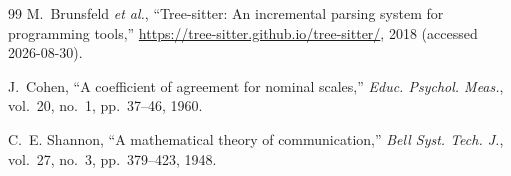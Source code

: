 \documentclass[conference]{IEEEtran}
\begin{document}
\begin{thebibliography}{99}
M.~Brunsfeld \emph{et al.}, ``Tree-sitter: An incremental parsing system
for programming tools,'' \url{https://tree-sitter.github.io/tree-sitter/},
2018 (accessed 2026-08-30).

J.~Cohen, ``A coefficient of agreement for nominal scales,'' \emph{Educ.
Psychol. Meas.}, vol.~20, no.~1, pp.~37--46, 1960.

C.~E. Shannon, ``A mathematical theory of communication,'' \emph{Bell Syst.
Tech. J.}, vol.~27, no.~3, pp.~379--423, 1948.

\end{thebibliography}
\end{document}
